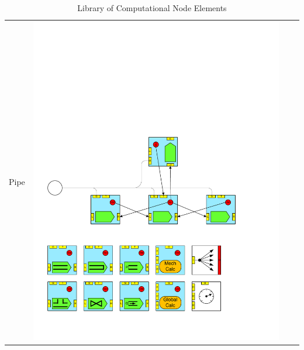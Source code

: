 %
\begin{table}
\begin{center}
\caption{Library of Computational Node Elements}
\begin{tabular}{|p{2cm}|c|p{2cm}|c|}
\hline
Pipe 			&\includegraphics[page=11, scale=0.25]{./figs/1dcfd/ElementalProcessors.pdf} &

\end{tabular}
\end{center}
\end{table}

